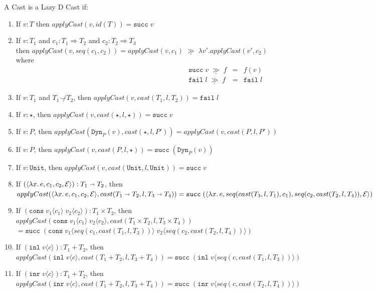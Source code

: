 \documentclass[acmsmall,review]{acmart}\settopmatter{printfolios=true,printccs=false,printacmref=false}
\newcommand{\mbind}{\ensuremath{\;\underline{\gg}\;}}
\newcommand{\plus}[0]{+}
\newcommand{\judgeType}[2]{#1 : #2}
\newcommand{\judgeTypeFT}[3]{#1 : #2 \Longrightarrow #3} %
\newcommand{\TOOdyn}[0]{\star}
\newcommand{\POOunit}[0]{\mathtt{Unit}}
\newcommand{\POOfun}[2]{#1 \shortrightarrow #2}
\newcommand{\POOprod}[2]{#1 \times #2}
\newcommand{\POOsum}[2]{#1 \plus #2}
\newcommand{\rOOsucc}[1]{\mathtt{succ}\;#1}
\newcommand{\rOOfail}[1]{\mathtt{fail}\;#1}
\newcommand{\hcvOOinj}[2]{\mathtt{Dyn}_{#1}(#2)}
\newcommand{\hcvOOfun}[5]{\langle \lambda #3.\, #4 , #1 , #5, #2 \rangle}
\newcommand{\hcvOOcons}[4]{\mathtt{cons}\;#1\langle#2\rangle\;#3\langle#4\rangle}
\newcommand{\hcvOOinl}[2]{\mathtt{inl}\;#1\langle#2\rangle}
\newcommand{\hcvOOinr}[2]{\mathtt{inr}\;#1\langle#2\rangle}
\begin{document}
\begin{definition}
  \label{def:Lazy-D-Cast-ADT}
  A  Cast is a Lazy D Cast if:
  \begin{enumerate}
  \item If $v : T$ then $applyCast(v,id(T)) = \mathtt{succ} \; v $
  \item If $\judgeType{v}{T_1}$ and
    $ \judgeTypeFT{c_1}{T_1}{T_2}$ and
    $ \judgeTypeFT{c_2}{T_2}{T_3}$\\
    then $applyCast(v,seq(c_1,c_2)) = 
    applyCast(v,c_1) \mbind{} \lambda v'.applyCast(v',c_2)$\\
    where 
    \[
    \begin{array}{rcl}
      \rOOsucc{v} \mbind{} f & = & f(v) \\
      \rOOfail{l} \mbind{} f & = & \rOOfail{l}
    \end{array}
    \]
  \item If $v : T_1$ and $T_1 \not\smile T_2$,
    then $applyCast(v,cast(T_1, l, T_2)) = \rOOfail{l} $
  \item If $v : \star$,
    then $applyCast(v,cast(\TOOdyn,l,\TOOdyn)) = \rOOsucc{v} $
  \item If $v : P$,
    then $applyCast(\hcvOOinj{P}{v},cast(\star,l,P')) 
    = applyCast(v,cast(P,l,P')) $
  \item If $v : P$,
    then $applyCast(v,cast(P,l,\star)) = \rOOsucc{(\hcvOOinj{P}{v})} $
  \item If $v : \POOunit$,
    then $applyCast(v,cast(\POOunit,l,\POOunit)) = \rOOsucc{v} $
  \item If $(\hcvOOfun{c_1}{\mathcal{E}}{x}{e}{c_2}) : \POOfun{T_1}{T_2}$,
    then\\
    $ 
    applyCast(\hcvOOfun{c_1}{\mathcal{E}}{x}{e}{c_2}, 
    cast(\POOfun{T_1}{T_2},l,\POOfun{T_3}{T_4})) \\
    = 
    \rOOsucc{(\hcvOOfun{seq(cast(T_3,l,T_1),c_1)}{\mathcal{E}}{x}{e}{seq(c_2,cast(T_2,l,T_4))})}$
  \item If $(\hcvOOcons{v_1}{c_1}{v_2}{c_2}) : \POOprod{T_1}{T_2}$,
    then \\
    $ 
    applyCast(\hcvOOcons{v_1}{c_1}{v_2}{c_2},cast(\POOprod{T_1}{T_2},l,T_3 
    \times 
    T_4))$\\
    $ = 
    \rOOsucc{(\hcvOOcons{v_1}{seq(c_1,cast(T_1,l,T_3))}{v_2}{seq(c_2,cast(T_2,l,T_4))})}
    $ 
  \item If $(\hcvOOinl{v}{c}) : \POOsum{T_1}{T_2}$,
    then \\
    $ 
    applyCast(\hcvOOinl{v}{c},cast(\POOsum{T_1}{T_2},l,\POOsum{T_3}{T_4}))
    = \rOOsucc{(\hcvOOinl{v}{seq(c,cast(T_1,l,T_3))})} $
  \item If $(\hcvOOinr{v}{c}) : \POOsum{T_1}{T_2}$,
    then \\$
    applyCast(\hcvOOinr{v}{c},cast(\POOsum{T_1}{T_2},l,\POOsum{T_3}{T_4}))
    = \rOOsucc{(\hcvOOinr{v}{seq(c,cast(T_2,l,T_4))})} $
  \end{enumerate}
\end{definition}
\end{document}
